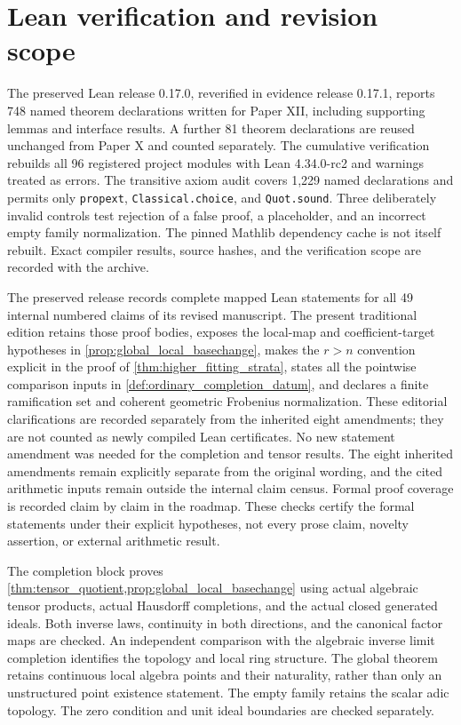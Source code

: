 \documentclass[11pt]{amsart}
\theoremstyle{definition}
\theoremstyle{remark}
\begin{document}
\section*{Lean verification and revision scope}

The preserved Lean release 0.17.0, reverified in evidence release 0.17.1, reports 748 named theorem declarations written for Paper XII, including supporting lemmas and interface results. A further 81 theorem declarations are reused unchanged from Paper X and counted separately. The cumulative verification rebuilds all 96 registered project modules with Lean 4.34.0-rc2 and warnings treated as errors. The transitive axiom audit covers 1,229 named declarations and permits only \texttt{propext}, \texttt{Classical.choice}, and \texttt{Quot.sound}. Three deliberately invalid controls test rejection of a false proof, a placeholder, and an incorrect empty family normalization. The pinned Mathlib dependency cache is not itself rebuilt. Exact compiler results, source hashes, and the verification scope are recorded with the archive.

The preserved release records complete mapped Lean statements for all 49 internal numbered claims of its revised manuscript. The present traditional edition retains those proof bodies, exposes the local-map and coefficient-target hypotheses in \cref{prop:global_local_basechange}, makes the \(r>n\) convention explicit in the proof of \cref{thm:higher_fitting_strata}, states all the pointwise comparison inputs in \cref{def:ordinary_completion_datum}, and declares a finite ramification set and coherent geometric Frobenius normalization. These editorial clarifications are recorded separately from the inherited eight amendments; they are not counted as newly compiled Lean certificates. No new statement amendment was needed for the completion and tensor results. The eight inherited amendments remain explicitly separate from the original wording, and the cited arithmetic inputs remain outside the internal claim census. Formal proof coverage is recorded claim by claim in the roadmap. These checks certify the formal statements under their explicit hypotheses, not every prose claim, novelty assertion, or external arithmetic result.

The completion block proves \cref{thm:tensor_quotient,prop:global_local_basechange} using actual algebraic tensor products, actual Hausdorff completions, and the actual closed generated ideals. Both inverse laws, continuity in both directions, and the canonical factor maps are checked. An independent comparison with the algebraic inverse limit completion identifies the topology and local ring structure. The global theorem retains continuous local algebra points and their naturality, rather than only an unstructured point existence statement. The empty family retains the scalar adic topology. The zero condition and unit ideal boundaries are checked separately.
\end{document}
